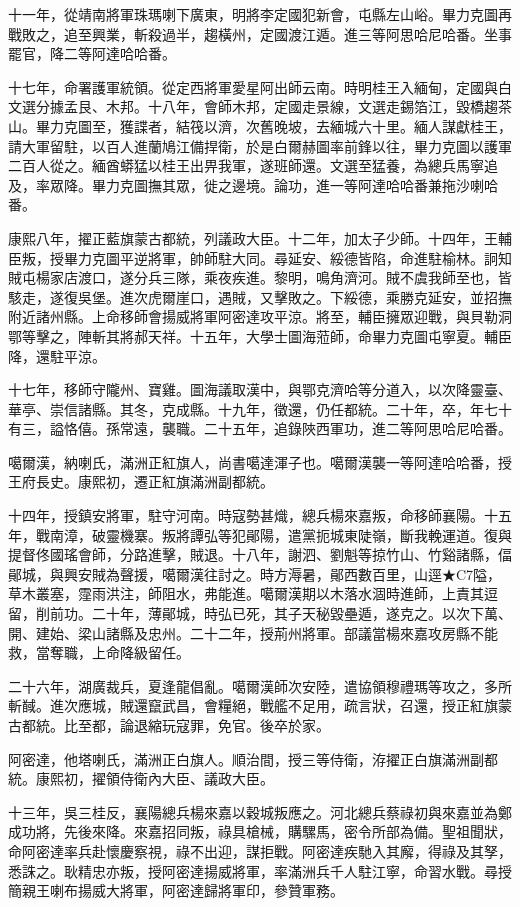 \begin{pinyinscope}
十一年，從靖南將軍珠瑪喇下廣東，明將李定國犯新會，屯縣左山峪。畢力克圖再戰敗之，追至興業，斬殺過半，趨橫州，定國渡江遁。進三等阿思哈尼哈番。坐事罷官，降二等阿達哈哈番。

十七年，命署護軍統領。從定西將軍愛星阿出師云南。時明桂王入緬甸，定國與白文選分據孟艮、木邦。十八年，會師木邦，定國走景線，文選走錫箔江，毀橋趨茶山。畢力克圖至，獲諜者，結筏以濟，次舊晚坡，去緬城六十里。緬人謀獻桂王，請大軍留駐，以百人進蘭鳩江備捍衛，於是白爾赫圖率前鋒以往，畢力克圖以護軍二百人從之。緬酋蟒猛以桂王出畀我軍，遂班師還。文選至猛養，為總兵馬寧追及，率眾降。畢力克圖撫其眾，徙之邊境。論功，進一等阿達哈哈番兼拖沙喇哈番。

康熙八年，擢正藍旗蒙古都統，列議政大臣。十二年，加太子少師。十四年，王輔臣叛，授畢力克圖平逆將軍，帥師駐大同。尋延安、綏德皆陷，命進駐榆林。詗知賊屯楊家店渡口，遂分兵三隊，乘夜疾進。黎明，鳴角濟河。賊不虞我師至也，皆駭走，遂復吳堡。進次虎爾崖口，遇賊，又擊敗之。下綏德，乘勝克延安，並招撫附近諸州縣。上命移師會揚威將軍阿密達攻平涼。將至，輔臣擁眾迎戰，與貝勒洞鄂等擊之，陣斬其將郝天祥。十五年，大學士圖海蒞師，命畢力克圖屯寧夏。輔臣降，還駐平涼。

十七年，移師守隴州、寶雞。圖海議取漢中，與鄂克濟哈等分道入，以次降靈臺、華亭、崇信諸縣。其冬，克成縣。十九年，徵還，仍任都統。二十年，卒，年七十有三，謚恪僖。孫常遠，襲職。二十五年，追錄陜西軍功，進二等阿思哈尼哈番。

噶爾漢，納喇氏，滿洲正紅旗人，尚書噶達渾子也。噶爾漢襲一等阿達哈哈番，授王府長史。康熙初，遷正紅旗滿洲副都統。

十四年，授鎮安將軍，駐守河南。時寇勢甚熾，總兵楊來嘉叛，命移師襄陽。十五年，戰南漳，破靈機寨。叛將譚弘等犯鄖陽，遣黨扼城東陡嶺，斷我輓運道。復與提督佟國瑤會師，分路進擊，賊退。十八年，謝泗、劉魁等掠竹山、竹谿諸縣，偪鄖城，與興安賊為聲援，噶爾漢往討之。時方溽暑，鄖西數百里，山逕★C7隘，草木叢塞，霪雨洪注，師阻水，弗能進。噶爾漢期以木落水涸時進師，上責其逗留，削前功。二十年，薄鄖城，時弘已死，其子天秘毀壘遁，遂克之。以次下萬、開、建始、梁山諸縣及忠州。二十二年，授荊州將軍。部議當楊來嘉攻房縣不能救，當奪職，上命降級留任。

二十六年，湖廣裁兵，夏逢龍倡亂。噶爾漢師次安陸，遣協領穆禮瑪等攻之，多所斬馘。進次應城，賊還竄武昌，會糧絕，戰艦不足用，疏言狀，召還，授正紅旗蒙古都統。比至都，論退縮玩寇罪，免官。後卒於家。

阿密達，他塔喇氏，滿洲正白旗人。順治間，授三等侍衛，洊擢正白旗滿洲副都統。康熙初，擢領侍衛內大臣、議政大臣。

十三年，吳三桂反，襄陽總兵楊來嘉以穀城叛應之。河北總兵蔡祿初與來嘉並為鄭成功將，先後來降。來嘉招同叛，祿具槍械，購騾馬，密令所部為備。聖祖聞狀，命阿密達率兵赴懷慶察視，祿不出迎，謀拒戰。阿密達疾馳入其廨，得祿及其孥，悉誅之。耿精忠亦叛，授阿密達揚威將軍，率滿洲兵千人駐江寧，命習水戰。尋授簡親王喇布揚威大將軍，阿密達歸將軍印，參贊軍務。


\end{pinyinscope}

